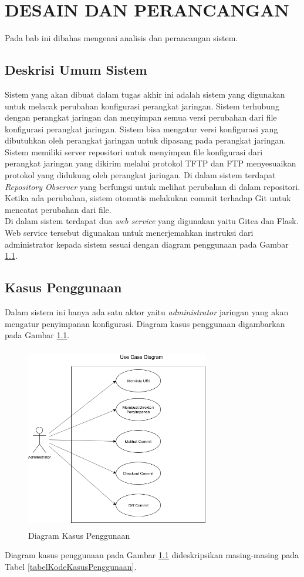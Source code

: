 \chapter{DESAIN DAN PERANCANGAN}
    Pada bab ini dibahas mengenai analisis dan perancangan sistem.
    
    \section{Deskrisi Umum Sistem}
    	Sistem yang akan dibuat dalam tugas akhir ini adalah sistem yang digunakan untuk melacak perubahan konfigurasi perangkat jaringan. Sistem terhubung dengan perangkat jaringan dan menyimpan semua versi perubahan dari file konfigurasi perangkat jaringan. Sistem bisa mengatur versi konfigurasi yang dibutuhkan oleh perangkat jaringan untuk dipasang pada perangkat jaringan.\\
    	
    	\indent Sistem memiliki server repositori untuk menyimpan file konfigurasi dari perangkat jaringan yang dikirim melalui protokol TFTP dan FTP menyesuaikan protokol yang didukung oleh perangkat jaringan. Di dalam sistem terdapat \textit{Repository Observer} yang berfungsi untuk melihat perubahan di dalam repositori. Ketika ada perubahan, sistem otomatis melakukan commit terhadap Git untuk mencatat perubahan dari file.\\
    	
    	\indent Di dalam sistem terdapat dua \textit{web service} yang digunakan yaitu Gitea dan Flask. Web service tersebut digunakan untuk menerjemahkan instruksi dari administrator kepada sistem sesuai dengan diagram penggunaan pada Gambar \ref{usecase}. 
	
    \section{Kasus Penggunaan}
    	Dalam sistem ini hanya ada satu aktor yaitu \textit{administrator} jaringan yang akan mengatur penyimpanan konfigurasi. Diagram kasus penggunaan digambarkan pada Gambar \ref{usecase}.
        \begin{figure}[H]
			\centering
			\includegraphics[width=8cm,height=8cm]{Images/C-3/UC.png}
			\caption{Diagram Kasus Penggunaan}
			\label{usecase}
		\end{figure}
        \indent Diagram kasus penggunaan pada Gambar \ref{usecase} dideskripsikan masing-masing pada Tabel \ref {tabelKodeKasusPenggunaan}.
        
